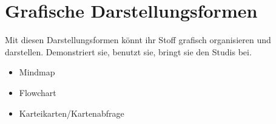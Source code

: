 \chapter{Grafische Darstellungsformen}
\label{grafische-darstellungsformen}

Mit diesen Darstellungsformen könnt ihr Stoff grafisch organisieren und darstellen. Demonstriert sie, benutzt sie, bringt sie den Studis bei.

\begin{itemize}
    \item Mindmap
    \item Flowchart
    \item Karteikarten/Kartenabfrage
\end{itemize}
